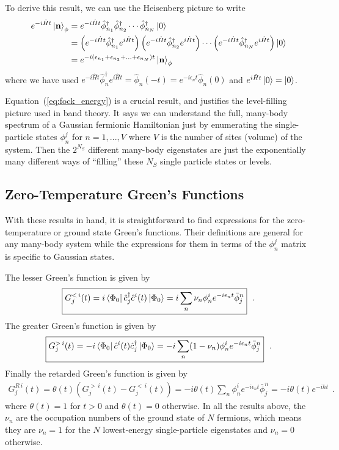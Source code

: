\documentclass[aps, superscriptaddress, floatfix, onecolumn]{revtex4-2}
\begin{document}
To derive this result, we can use the Heisenberg picture to write
\begin{align}
e^{-i \hat{H} t} \ket{\mathbf{n}}_\phi  & = e^{-i \hat{H} t} \hat{\phi}^\dagger_{n_1} \hat{\phi}^\dagger_{n_2} \cdots \hat{\phi}^\dagger_{n_N} \ket{0} \\
& =  \left( e^{-i \hat{H} t} \hat{\phi}^\dagger_{n_1}  e^{i \hat{H} t} \right) \left(e^{-i \hat{H} t} \hat{\phi}^\dagger_{n_2}  e^{i \hat{H} t} \right) \cdots  \left( e^{-i \hat{H} t} \hat{\phi}^\dagger_{n_N}  e^{i \hat{H} t}\right) \ket{0}  \\ 
& = e^{-i (\epsilon_{n_1} + \epsilon_{n_2} + \ldots + \epsilon_{n_N}) t} \ket{\mathbf{n}}_\phi \label{eq:eigenstate_t_evolution}
\end{align}
where we have used $e^{-i \hat{H} t} \hat{\phi}^\dagger_{n}  e^{i \hat{H} t} = \hat{\phi}_n(-t) =  e^{-i \epsilon_n t} \hat{\phi}_n(0)$ and $e^{i \hat{H} t} \ket{0} = \ket{0}$.
 
Equation~(\ref{eq:fock_energy}) is a crucial result, and justifies the level-filling picture used in band theory. It says we can understand the full, many-body spectrum of a Gaussian fermionic Hamiltonian just by enumerating the single-particle states $\phi_n^j$ for $n=1,...,V$ where $V$ is the number of sites (volume) of the system. Then the $2^{N_S}$ different many-body eigenstates are just the exponentially many different ways of ``filling'' these $N_S$ single particle states or levels.


\subsection{Zero-Temperature Green's Functions}

With these results in hand, it is straightforward to find expressions for the zero-temperature or ground state Green's functions. 
Their definitions are general for any many-body system while the expressions for them in terms of the $\phi^j_n$ matrix is specific to Gaussian states.

The lesser Green's function is given by
\begin{align}
\boxed{G^{<\, i}_j(t)= i \bra{\Phi_0} \hat{c}^\dagger_j \hat{c}^i(t) \ket{\Phi_0}  = i \sum_n \nu_n  \phi^i_n e^{-i \epsilon_n t}  \bar{\phi}_j^n} \ \ .
\end{align}
The greater Green's function is given by
\begin{align}
\boxed{G^{>\, i}_j(t)= -i \bra{\Phi_0} \hat{c}^i(t) \hat{c}^\dagger_j \ket{\Phi_0} = -i \sum_n (1-\nu_n) \phi^i_n e^{-i \epsilon_n t} \bar{\phi}_j^n} \ \ .
\end{align}
Finally the retarded Green's function is given by
\begin{align}
\boxed{G^{R\, i}_j(t) = \theta(t)(G^{>\, i}_j(t) - G^{<\, i}_j(t)) = -i \theta(t) \sum_n \phi^i_n e^{-i \epsilon_n t} \bar{\phi}_j^n  = -i \theta(t) e^{-i h t} } \ \ .  \label{eq:GR}
\end{align}
where $\theta(t) = 1$ for $t > 0$ and $\theta(t) = 0$ otherwise.
In all the results above, the $\nu_n$ are the occupation numbers of the ground state of $N$ fermions, which means they are $\nu_n = 1$ for the $N$ lowest-energy single-particle eigenstates and $\nu_n = 0$ otherwise.
\end{document}
